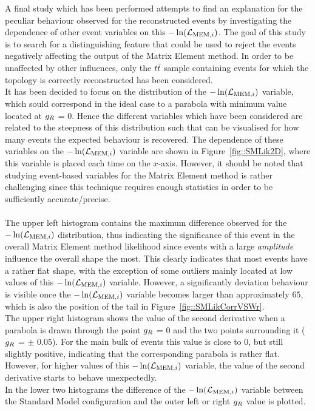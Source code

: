 A final study which has been performed attempts to find an explanation for the peculiar behaviour observed for the reconstructed events by investigating the dependence of other event variables on this $-\ln(\mathcal{L}_{\textrm{MEM}, i})$.
The goal of this study is to search for a distinguishing feature that could be used to reject the events negatively affecting the output of the Matrix Element method.
In order to be unaffected by other influences, only the $t\bar{t}$ sample containing events for which the topology is correctly reconstructed has been considered.
\\
It has been decided to focus on the distribution of the $-\ln(\mathcal{L}_{\textrm{MEM}, i})$ variable, which sould correspond in the ideal case to a parabola with minimum value located at $g_{R}$ = 0.
Hence the different variables which have been considered are related to the steepness of this distribution such that can be visualised for how many events the expected behaviour is recovered.
The dependence of these variables on the $-\ln(\mathcal{L}_{\textrm{MEM}, i})$ variable are shown in Figure~\ref{fig::SMLik2D}, where this variable is placed each time on the $x$-axis.
However, it should be noted that studying event-based variables for the Matrix Element method is rather challenging since this technique requires enough statistics in order to be sufficiently accurate/precise.
\\
\\
The upper left histogram contains the maximum difference observed for the $-\ln(\mathcal{L}_{\textrm{MEM}, i})$ distribution, thus indicating the significance of this event in the overall Matrix Element method likelihood since events with a large \textit{amplitude} influence the overall shape the most. 
This clearly indicates that most events have a rather flat shape, with the exception of some outliers mainly located at low values of this $-\ln(\mathcal{L}_{\textrm{MEM}, i})$ variable. However, a significantly deviation behaviour is visible once the $-\ln(\mathcal{L}_{\textrm{MEM}, i})$ variable becomes larger than approximately $65$, which is also the position of the tail in Figure~\ref{fig::SMLikCorrVSWr}.
\\
The upper right histogram shows the value of the second derivative when a parabola is drawn through the point $g_{R}$ = $0$ and the two points surrounding it ($g_{R}$ = $\pm$ $0.05$).
For the main bulk of events this value is close to $0$, but still slightly positive, indicating that the corresponding parabola is rather flat. However, for higher values of this $-\ln(\mathcal{L}_{\textrm{MEM}, i})$ variable, the value of the second derivative starts to behave unexpectedly.
\\
In the lower two histograms the difference of the $-\ln(\mathcal{L}_{\textrm{MEM}, i})$ variable between the Standard Model configuration and the outer left or right $g_{R}$ value is plotted.
